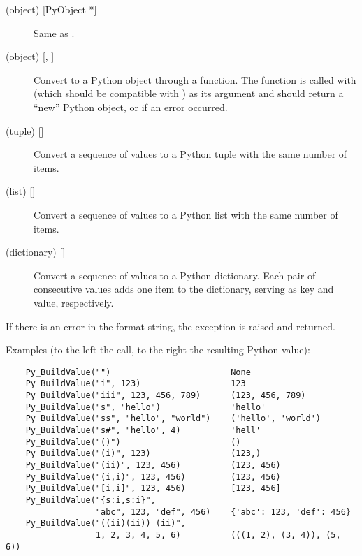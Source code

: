 \documentclass[twoside,openright]{report}
\begin{document}
\begin{description}
\item[ (object) {[PyObject *]}]
Same as .

\item[ (object) {[, ]}]
Convert  to a Python object through a 
function.  The function is called with  (which should be
compatible with ) as its argument and should return a
``new'' Python object, or \NULL{} if an error occurred.

\item[ (tuple) {[]}]
Convert a sequence of \C{} values to a Python tuple with the same number
of items.

\item[ (list) {[]}]
Convert a sequence of \C{} values to a Python list with the same number
of items.

\item[ (dictionary) {[]}]
Convert a sequence of \C{} values to a Python dictionary.  Each pair of
consecutive \C{} values adds one item to the dictionary, serving as key
and value, respectively.

\end{description}

If there is an error in the format string, the
 exception is raised and \NULL{} returned.

Examples (to the left the call, to the right the resulting Python value):

\bcode\begin{verbatim}
    Py_BuildValue("")                        None
    Py_BuildValue("i", 123)                  123
    Py_BuildValue("iii", 123, 456, 789)      (123, 456, 789)
    Py_BuildValue("s", "hello")              'hello'
    Py_BuildValue("ss", "hello", "world")    ('hello', 'world')
    Py_BuildValue("s#", "hello", 4)          'hell'
    Py_BuildValue("()")                      ()
    Py_BuildValue("(i)", 123)                (123,)
    Py_BuildValue("(ii)", 123, 456)          (123, 456)
    Py_BuildValue("(i,i)", 123, 456)         (123, 456)
    Py_BuildValue("[i,i]", 123, 456)         [123, 456]
    Py_BuildValue("{s:i,s:i}",
                  "abc", 123, "def", 456)    {'abc': 123, 'def': 456}
    Py_BuildValue("((ii)(ii)) (ii)",
                  1, 2, 3, 4, 5, 6)          (((1, 2), (3, 4)), (5, 6))
\end{verbatim}\ecode
%
\end{document}

